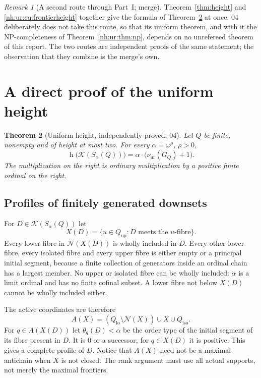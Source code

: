 \documentclass[11pt,a4paper]{article}
\newtheorem{theorem}{Theorem}[section]
\theoremstyle{definition}
\theoremstyle{remark}
\newtheorem{remark}[theorem]{Remark}
\newcommand{\K}{\mathcal K}
\newcommand{\hgt}{\operatorname{h}}
\newcommand{\Qlo}{Q_{\mathrm{lo}}}
\newcommand{\Qup}{Q_{\mathrm{up}}}
\newcommand{\Qiso}{Q_{\mathrm{iso}}}
\newcommand{\Nb}{\mathcal N}
\newcommand{\nuur}{\nu_{\mathrm{ur}}}
\begin{document}
\begin{remark}[A second route through Part~I; merge]\label{nh:ur:rem:secondroute}
Theorem~\ref{thm:height} and \eqref{nh:ur:eq:frontierheight} together give
the formula of Theorem~\ref{nh:ur:thm:uniform} at once. 04 deliberately does
not take this route, so that its uniform theorem, and with it the
NP-completeness of Theorem~\ref{nh:ur:thm:np}, depends on no unrefereed
theorem of this report. The two routes are independent proofs of the same
statement; the observation that they combine is the merge's own.
\end{remark}

\section{A direct proof of the uniform height}\label{nh:ur:sec:uniform}
\setcounter{equation}{0}

\begin{theorem}[Uniform height, independently proved; 04]\label{nh:ur:thm:uniform}
Let $Q$ be finite, nonempty and of height at most two. For every
$\alpha=\omega^\rho$, $\rho>0$,
\begin{equation}\label{nh:ur:eq:uniform}
 \boxed{\displaystyle
 \hgt\bigl(\K(S_\alpha(Q))\bigr)
   =\alpha\cdot\bigl(\nuur(G_Q)+1\bigr).}
\end{equation}
The multiplication on the right is ordinary multiplication by a positive
finite ordinal on the right.
\end{theorem}

\subsection{Profiles of finitely generated downsets}
For $D\in\K(S_\alpha(Q))$ let
\[
 X(D)=\{u\in\Qup:D\text{ meets the }u\text{-fibre}\}.
\]
Every lower fibre in $\Nb(X(D))$ is wholly included in $D$. Every other
lower fibre, every isolated fibre and every upper fibre is either empty or a
principal initial segment, because a finite collection of generators inside
an ordinal chain has a largest member. No upper or isolated fibre can be
wholly included: $\alpha$ is a limit ordinal and has no finite cofinal
subset. A lower fibre not below $X(D)$ cannot be wholly included either.

The active coordinates are therefore
\[
 A(X)=(\Qlo\setminus\Nb(X))\cup X\cup\Qiso .
\]
For $q\in A(X(D))$ let $\theta_q(D)<\alpha$ be the order type of the initial
segment of its fibre present in $D$. It is $0$ or a successor; for
$q\in X(D)$ it is positive. This gives a complete profile of $D$. Notice
that $A(X)$ need not be a maximal antichain when $X$ is not closed. The rank
argument must use all actual supports, not merely the maximal frontiers.
\end{document}
